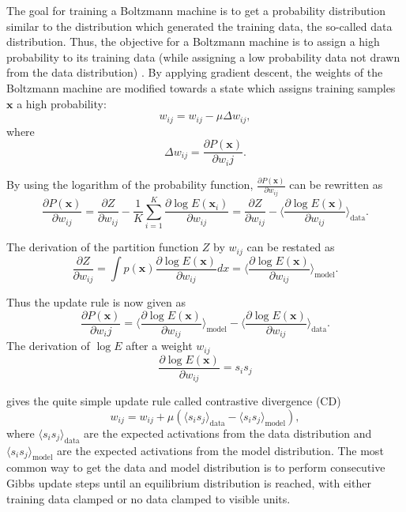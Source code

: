 The goal for training a Boltzmann machine is to get a probability distribution similar to the distribution which generated the training data, the so-called data distribution.
Thus, the objective for a Boltzmann machine is to assign a high probability to its training data (while assigning a low probability data not drawn from the data distribution) \cite{ackley1985learning} \cite{hinton2002training} \cite{Woodford2002} \cite{Bengio2009}.
By applying gradient descent, the weights of the Boltzmann machine are modified towards a state which assigns training samples $\textbf{x}$ a high probability:
\[
w_{ij} = w_{ij} - \mu \Delta w_{ij},
\]
where
\[
\Delta w_{ij} = \frac{\partial P(\textbf{x})}{\partial w_ij}.
\]

By using the logarithm of the probability function, $\frac{\partial P(\textbf{x})}{\partial w_{ij}}$ can be rewritten as
\[
\frac{\partial P(\textbf{x})}{\partial w_{ij}} = \frac{\partial Z}{\partial w_{ij}} - \frac{1}{K} \sum_{i=1}^K \frac{\partial \log E(\textbf{x}_i)}{\partial w_{ij}} =  \frac{\partial Z}{\partial w_{ij}} - \Big \langle \frac{\partial \log E(\textbf{x})}{\partial w_{ij}} \Big \rangle_{\text{data}}.
\]    

The derivation of the partition function $Z$ by $w_{ij}$ can be restated as
\[
 \frac{\partial Z}{\partial w_{ij}} = \int p(\textbf{x}) \frac{\partial \log E(\textbf{x})}{\partial w_{ij}} dx = \Big \langle \frac{\partial \log E(\textbf{x})}{\partial w_{ij}} \Big \rangle_{\text{model}}.
\]

Thus the update rule is now given as
\[
\frac{\partial P(\textbf{x})}{\partial w_ij} =  \Big \langle \frac{\partial \log E(\textbf{x})}{\partial w_{ij}} \Big \rangle_{\text{model}} - \Big \langle \frac{\partial \log E(\textbf{x})}{\partial w_{ij}} \Big \rangle_{\text{data}}.
\]
The derivation of $\log E$ after a weight $w_{ij}$
\[
\frac{\partial \log E(\textbf{x})}{\partial w_{ij}} = s_i s_j
\]

gives the quite simple update rule called contrastive divergence (CD)
\[
w_{ij}= w_{ij} + \mu ( \langle s_i s_j \rangle_{\text{data}} - \langle s_i s_j \rangle_{\text{model}} ) ,
\]
where $\langle s_i s_j \rangle_{\text{data}}$ are the expected activations from the data distribution and  $ \langle s_i s_j \rangle_{\text{model}}$ are the expected activations from the model distribution.
The most common way to get the data and model distribution is to perform consecutive Gibbs update steps until an equilibrium distribution is reached, with either training data clamped or no data clamped to visible units.

